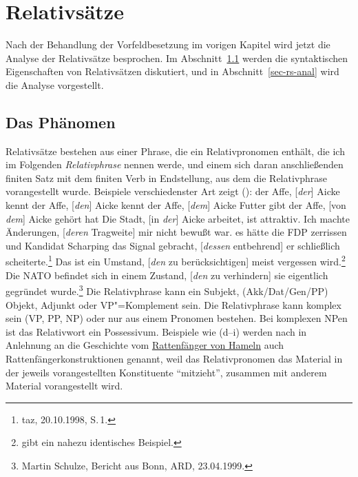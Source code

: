 
\chapter{Relativsätze}
\label{Kapitel-rs}

{%
Nach der Behandlung der Vorfeldbesetzung im vorigen Kapitel wird jetzt
die Analyse der Relativsätze besprochen. Im Abschnitt~\ref{sec-rs-phenomena} werden die syntaktischen
Eigenschaften von Relativsätzen diskutiert, und in Abschnitt~\ref{sec-rs-anal}
wird die Analyse vorgestellt.

\section{Das Phänomen}
\label{sec-rs-phenomena}

Relativsätze bestehen aus einer Phrase, die ein Relativpronomen enthält, die ich im Folgenden
\emph{Relativphrase} nennen werde, und einem sich daran anschließenden finiten Satz mit dem finiten Verb in 
Endstellung, aus dem die Relativphrase vorangestellt wurde. Beispiele verschiedenster Art zeigt ():
\eal
\label{bsp-relativsaetze}
\ex der Affe, [\emph{der}] Aicke kennt \label{r1}
\ex der Affe, [\emph{den}] Aicke kennt \label{r1b}
\ex der Affe, [\emph{dem}] Aicke Futter gibt \label{r1c}
\ex der Affe, [von \emph{dem}] Aicke gehört hat \label{r2}
\ex Die Stadt, [in \emph{der}] Aicke arbeitet, ist attraktiv. \label{r3}
\ex Ich machte Änderungen, [\emph{deren} Tragweite] mir nicht bewußt war.\label{r4}
\ex es hätte die FDP zerrissen und Kandidat Scharping das Signal gebracht, [\emph{dessen} entbehrend] er schließlich scheiterte.\footnote{
  taz, 20.10.1998, S.\,1.}
\ex Das ist ein Umstand, [\emph{den} zu berücksichtigen] meist vergessen wird.\label{r5}\footnote{
  \citet[]{Bech55a} gibt ein nahezu identisches Beispiel.%
}
\ex Die NATO befindet sich in einem Zustand, [\emph{den} zu verhindern] sie eigentlich gegründet wurde.\footnote{
  Martin Schulze, Bericht aus Bonn, ARD, 23.04.1999.}
\zl
Die Relativphrase kann ein Subjekt, (Akk/Dat/Gen/PP) Objekt, Adjunkt oder VP"=Komplement sein.
\label{page-rattenfaenger}%
Die Relativphrase kann komplex sein (VP, PP, NP) oder nur aus einem Pronomen bestehen.
Bei komplexen NPen ist das Relativwort ein Possessivum. 
Beispiele wie (d--i) werden nach \citet*[]{Ross67} in Anlehnung an die Geschichte vom 
\href{http://www.hameln.de/tourismus/rattenfaenger/}{Rat\-ten\-fän\-ger von Hameln} 
auch Rattenfängerkonstruktionen genannt,
weil das Relativpronomen das Material in der jeweils vorangestellten Konstituente "`mitzieht"', \dash
zusammen mit anderem Material vorangestellt wird.

}
